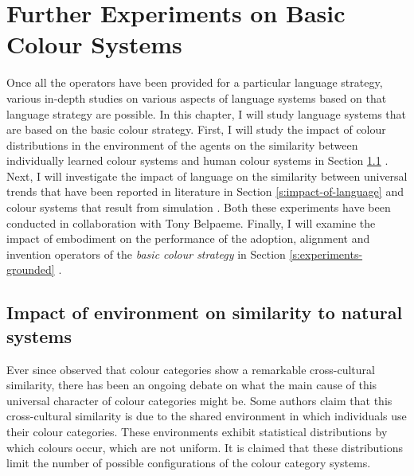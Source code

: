 \chapter{Further Experiments on Basic Colour Systems}
\label{s:basic-experiments}

Once all the operators have been provided for a particular language
strategy, various in-depth studies on various aspects of language
systems based on that language strategy are possible. In this chapter,
I will study language systems that are based on the basic colour
strategy. First, I will study the impact of colour distributions in
the environment of the agents on the similarity between individually
learned colour systems and human colour systems in Section
\ref{s:impact-of-environment} \citep{belpaeme09impact}. Next, I will
investigate the impact of language on the similarity between universal
trends that have been reported in literature in Section
\ref{s:impact-of-language} and colour systems that result from
simulation \citep{belpaeme05eelc, belpaeme05explaining,
  belpaeme07language}. Both these experiments have been conducted in
collaboration with Tony Belpaeme. Finally, I will examine the impact
of embodiment on the performance of the adoption, alignment and
invention operators of the \emph{basic colour strategy} in Section
\ref{s:experiments-grounded} \citep{bleys09grounded}.

\section{Impact of environment on similarity to natural systems}
\label{s:impact-of-environment}

Ever since \cite{berlin69basic} observed that colour categories show a
remarkable cross-cultural similarity, there has been an
ongoing debate on what the main cause of this universal character of
colour categories might be. Some authors
\citep{vanwijk59crosscultural, shepard92perceptual,
  yendrikhovskij01computational} claim that this cross-cultural
similarity is due to the shared environment in which individuals use
their colour categories. These environments exhibit statistical
distributions by which colours occur, which are not uniform. It is
claimed that these distributions limit the number of possible
configurations of the colour category systems.

